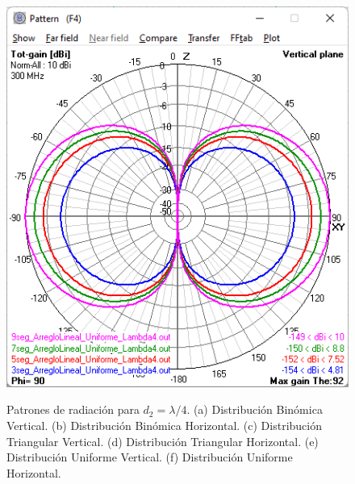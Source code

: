 \documentclass[11pt]{report}
\begin{document}
\begin{figure}[h!]
{		\includegraphics[scale=0.47]{IMAGENES/c15}\label{c15}}
	
	\caption{Patrones de radiación para $d_2=\lambda/4$.
		(a) Distribución Binómica Vertical.
		(b) Distribución Binómica Horizontal.
		(c) Distribución Triangular Vertical.
		(d) Distribución Triangular Horizontal.
		(e) Distribución Uniforme Vertical.
		(f) Distribución Uniforme Horizontal.}
\end{figure}
\end{document}
